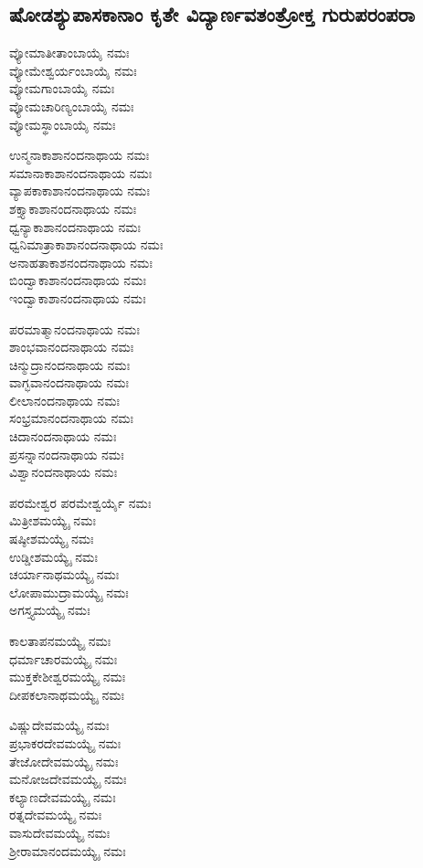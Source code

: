 \subsection{ಷೋಡಶ್ಯುಪಾಸಕಾನಾಂ ಕೃತೇ ವಿದ್ಯಾರ್ಣವತಂತ್ರೋಕ್ತ ಗುರುಪರಂಪರಾ}
 ವ್ಯೋಮಾತೀತಾಂಬಾಯೈ ನಮಃ\\
 ವ್ಯೋಮೇಶ್ವರ್ಯಂಬಾಯೈ ನಮಃ\\
 ವ್ಯೋಮಗಾಂಬಾಯೈ ನಮಃ\\
 ವ್ಯೋಮಚಾರಿಣ್ಯಂಬಾಯೈ ನಮಃ\\
 ವ್ಯೋಮಸ್ಥಾಂಬಾಯೈ ನಮಃ

 ಉನ್ಮನಾಕಾಶಾನಂದನಾಥಾಯ ನಮಃ\\
 ಸಮಾನಾಕಾಶಾನಂದನಾಥಾಯ ನಮಃ\\
 ವ್ಯಾಪಕಾಕಾಶಾನಂದನಾಥಾಯ ನಮಃ\\
 ಶಕ್ತ್ಯಾಕಾಶಾನಂದನಾಥಾಯ ನಮಃ\\
 ಧ್ವನ್ಯಾಕಾಶಾನಂದನಾಥಾಯ ನಮಃ\\
 ಧ್ವನಿಮಾತ್ರಾಕಾಶಾನಂದನಾಥಾಯ ನಮಃ\\
 ಅನಾಹತಾಕಾಶನಂದನಾಥಾಯ ನಮಃ\\
 ಬಿಂದ್ವಾಕಾಶಾನಂದನಾಥಾಯ ನಮಃ\\
 ಇಂದ್ವಾಕಾಶಾನಂದನಾಥಾಯ ನಮಃ

 ಪರಮಾತ್ಮಾನಂದನಾಥಾಯ ನಮಃ\\
 ಶಾಂಭವಾನಂದನಾಥಾಯ ನಮಃ\\
 ಚಿನ್ಮುದ್ರಾನಂದನಾಥಾಯ ನಮಃ\\
 ವಾಗ್ಭವಾನಂದನಾಥಾಯ ನಮಃ\\
 ಲೀಲಾನಂದನಾಥಾಯ ನಮಃ\\
 ಸಂಭ್ರಮಾನಂದನಾಥಾಯ ನಮಃ\\
 ಚಿದಾನಂದನಾಥಾಯ ನಮಃ\\
 ಪ್ರಸನ್ನಾನಂದನಾಥಾಯ ನಮಃ\\
 ವಿಶ್ವಾನಂದನಾಥಾಯ ನಮಃ

 ಪರಮೇಶ್ವರ ಪರಮೇಶ್ವರ್ಯೈ ನಮಃ\\
 ಮಿತ್ರೀಶಮಯ್ಯೈ ನಮಃ\\
 ಷಷ್ಠೀಶಮಯ್ಯೈ ನಮಃ\\
 ಉಡ್ಡೀಶಮಯ್ಯೈ ನಮಃ\\
 ಚರ್ಯಾನಾಥಮಯ್ಯೈ ನಮಃ\\
 ಲೋಪಾಮುದ್ರಾಮಯ್ಯೈ ನಮಃ\\
 ಅಗಸ್ತ್ಯಮಯ್ಯೈ ನಮಃ

 ಕಾಲತಾಪನಮಯ್ಯೈ ನಮಃ\\
 ಧರ್ಮಾಚಾರಮಯ್ಯೈ ನಮಃ\\
 ಮುಕ್ತಕೇಶೀಶ್ವರಮಯ್ಯೈ ನಮಃ\\
 ದೀಪಕಲಾನಾಥಮಯ್ಯೈ ನಮಃ

 ವಿಷ್ಣುದೇವಮಯ್ಯೈ ನಮಃ\\
 ಪ್ರಭಾಕರದೇವಮಯ್ಯೈ ನಮಃ\\
 ತೇಜೋದೇವಮಯ್ಯೈ ನಮಃ\\
 ಮನೋಜದೇವಮಯ್ಯೈ ನಮಃ\\
 ಕಲ್ಯಾಣದೇವಮಯ್ಯೈ ನಮಃ\\
 ರತ್ನದೇವಮಯ್ಯೈ ನಮಃ\\
 ವಾಸುದೇವಮಯ್ಯೈ ನಮಃ\\
 ಶ್ರೀರಾಮಾನಂದಮಯ್ಯೈ ನಮಃ

